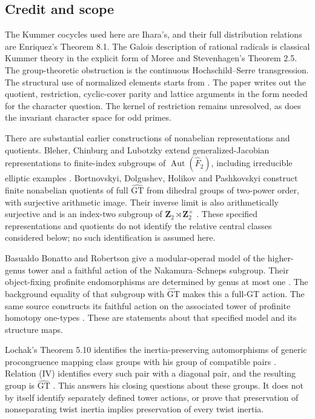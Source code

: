 \documentclass[11pt,a4paper]{article}
\theoremstyle{definition}
\theoremstyle{remark}
\newcommand{\GT}{\widehat{\mathrm{GT}}}
\newcommand{\Z}{\mathbf Z}
\begin{document}
\subsection*{Credit and scope}
The Kummer cocycles used here are Ihara's, and their full distribution relations are Enriquez's Theorem 8.1. The Galois description of rational radicals is classical Kummer theory in the explicit form of Moree and Stevenhagen's Theorem 2.5. The group-theoretic obstruction is the continuous Hochschild--Serre transgression. The structural use of normalized elements starts from \cite[Theorem 2]{H17}. The paper writes out the quotient, restriction, cyclic-cover parity and lattice arguments in the form needed for the character question. The kernel of restriction remains unresolved, as does the invariant character space for odd primes.

There are substantial earlier constructions of nonabelian representations
and quotients. Bleher, Chinburg and Lubotzky extend generalized-Jacobian
representations to finite-index subgroups of
$\operatorname{Aut}(\widehat F_2)$, including irreducible elliptic
examples \cite[Theorems 1.1--1.3]{BCL2022}. Bortnovskyi, Dolgushev,
Holikov and Pashkovskyi construct finite nonabelian quotients of full
$\GT$ from dihedral groups of two-power order, with surjective
arithmetic image. Their inverse limit is also arithmetically
surjective and is an index-two subgroup of
$\Z_2\rtimes\Z_2^\times$
\cite[Theorem 5.3, Corollary 5.4, Theorem 5.7 and Proposition 5.8]{BDHP2026}.
These specified representations and quotients do not identify the
relative central classes considered below; no such identification
is assumed here.

Basualdo Bonatto and Robertson give a modular-operad model of the
higher-genus tower and a faithful action of the Nakamura--Schneps
subgroup. Their object-fixing profinite endomorphisms are determined
by genus at most one \cite[Corollary~4.4 and Theorem~4.9]{BBR2026}.
The background equality of that subgroup with $\GT$ makes this
a full-GT action. The same source constructs its faithful action on
the associated tower of profinite homotopy one-types
\cite[Corollary~6.13 and Proposition~6.14]{BBR2026}.
These are statements about that specified model and its structure maps.

Lochak's Theorem 5.10 identifies the inertia-preserving automorphisms of generic procongruence mapping class groups with his group of compatible pairs \cite[Definition 5.4, Theorem 5.10]{Lochak2025}. Relation (IV) identifies every such pair with a diagonal pair, and the resulting group is $\GT$ \cite[Corollary 22]{H17}. This answers his closing questions about these groups. It does not by itself identify separately defined tower actions, or prove that preservation of nonseparating twist inertia implies preservation of every twist inertia.
\end{document}
